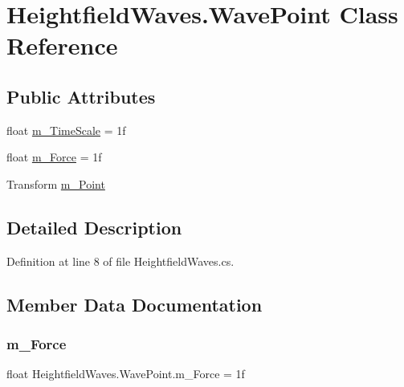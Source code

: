 \hypertarget{class_heightfield_waves_1_1_wave_point}{}\section{Heightfield\+Waves.\+Wave\+Point Class Reference}
\label{class_heightfield_waves_1_1_wave_point}
\subsection*{Public Attributes}
\begin{DoxyCompactItemize}
\item 
float \mbox{\hyperlink{class_heightfield_waves_1_1_wave_point_a2b3996ebc7dcc1348171a34c3e46c5a9}{m\+\_\+\+Time\+Scale}} = 1f
\item 
float \mbox{\hyperlink{class_heightfield_waves_1_1_wave_point_a3dc7a2ef426620c7bdb173dd3eccaaa5}{m\+\_\+\+Force}} = 1f
\item 
Transform \mbox{\hyperlink{class_heightfield_waves_1_1_wave_point_a83af183ce83dc2d1e85771bc0a8effb3}{m\+\_\+\+Point}}
\end{DoxyCompactItemize}


\subsection{Detailed Description}


Definition at line 8 of file Heightfield\+Waves.\+cs.



\subsection{Member Data Documentation}
\mbox{\label{class_heightfield_waves_1_1_wave_point_a3dc7a2ef426620c7bdb173dd3eccaaa5}} 
\subsubsection{\texorpdfstring{m\+\_\+\+Force}{m\_Force}}
{\footnotesize\ttfamily float Heightfield\+Waves.\+Wave\+Point.\+m\+\_\+\+Force = 1f}



